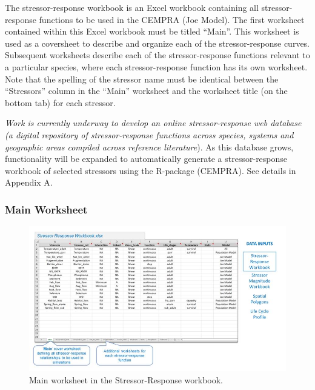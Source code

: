 \documentclass[
  letterpaper,
  DIV=11,
  numbers=noendperiod]{scrreprt}
\begin{document}
The stressor-response workbook is an Excel workbook containing all
stressor-response functions to be used in the CEMPRA (Joe Model). The
first worksheet contained within this Excel workbook must be titled
``Main''. This worksheet is used as a coversheet to describe and
organize each of the stressor-response curves. Subsequent worksheets
describe each of the stressor-response functions relevant to a
particular species, where each stressor-response function has its own
worksheet. Note that the spelling of the stressor name must be identical
between the ``Stressors'' column in the ``Main'' worksheet and the
worksheet title (on the bottom tab) for each stressor.

\emph{Work is currently underway to develop an online stressor-response
web database (a digital repository of stressor-response functions across
species, systems and geographic areas compiled across reference
literature}). As this database grows, functionality will be expanded to
automatically generate a stressor-response workbook of selected
stressors using the R-package (CEMPRA). See details in Appendix A.

\hypertarget{main-worksheet}{%
\subsubsection{Main Worksheet}\label{main-worksheet}}

\begin{figure}

{\centering \includegraphics{images/image019.jpg}

}

\caption{\label{fig-main-worksheet}Main worksheet in the
Stressor-Response workbook.}

\end{figure}
\end{document}
